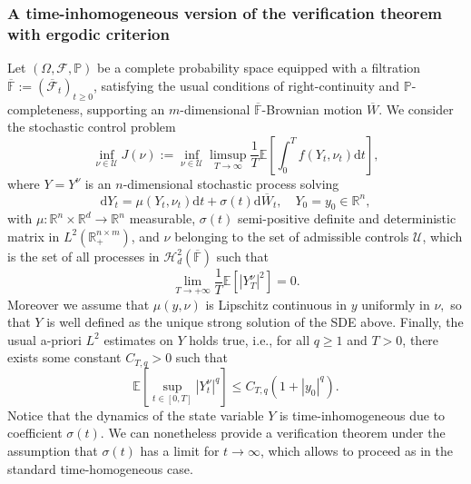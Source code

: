 \documentclass[a4paper,10pt]{article}
\newcommand{\D}{\mathrm{d}}
\theoremstyle{definition}
\theoremstyle{plain}
\numberwithin{equation}{section}
\begin{document}
\subsubsection{A time-inhomogeneous version of the verification theorem with ergodic criterion}\label{sec:ver_thm}
Let $(\Omega, \mathcal F, \mathbb P)$ be a complete probability space equipped with a filtration $\overline{\mathbb F}:=(\overline{\mathcal F}_t)_{t \geq 0}$, satisfying the usual conditions of right-continuity and $\mathbb P$-completeness, supporting an $m$-dimensional $\overline{\mathbb F}$-Brownian motion $\overline W$. We consider the stochastic control problem
\[ 
\inf_{\nu \in \mathcal U} J(\nu) := \inf_{\nu \in \mathcal U} \limsup_{T \to \infty} \frac{1}{T} \mathbb E\left[ \int_0 ^T f(Y_t , \nu_t) \D t \right],
\]
where $Y = Y^\nu$ is an $n$-dimensional stochastic process solving
\[ 
\D Y_t = \mu(Y_t, \nu_t) \D t + \sigma(t) \D \overline W_t, \quad Y_0 = y_0 \in \mathbb R^n,
\]
with $\mu : \mathbb R^n \times \mathbb R^d \to \mathbb R^n$ measurable, $\sigma(t)$ semi-positive definite and deterministic matrix in $ L^2(\mathbb R_+^{n \times m})$,
and $\nu$ belonging to the set of admissible controls $\mathcal U$, which is the set of all processes in $\mathcal H^2 _d (\overline{\mathbb F})$ such that
\[\lim_{T \to +\infty} \frac{1}{T}\mathbb E\left[ | Y^\nu _T|^2 \right] = 0.\]
Moreover we assume that $\mu (y,\nu)$ is Lipschitz continuous in $y$ uniformly in $\nu,$ so that $Y$ is well defined as the unique strong solution of the SDE above. Finally, the usual a-priori $L^2$ estimates on $Y$ holds true, i.e., for all $q \geq 1$ and $T >0$, there exists some constant $C_{T,q}>0$ such that \[\mathbb E\left[\sup_{t \in [0,T]}| Y^\nu _t |^q \right] \leq C_{T,q}(1+|y_0|^q).\]
Notice that the dynamics of the state variable $Y$ is time-inhomogeneous due to coefficient $\sigma(t)$. We can nonetheless provide a verification theorem under the assumption that $\sigma(t)$ has a limit for $t \to \infty$, which allows to proceed as in the standard time-homogeneous case.
\end{document}
